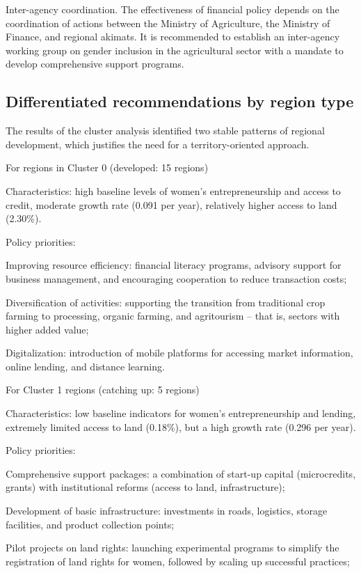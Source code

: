 ﻿\documentclass[pdflatex,sn-mathphys-ay]{sn-jnl}
\begin{document}
Inter-agency coordination. The effectiveness of financial policy depends
on the coordination of actions between the Ministry of Agriculture, the
Ministry of Finance, and regional akimats. It is recommended to
establish an inter-agency working group on gender inclusion in the
agricultural sector with a mandate to develop comprehensive support
programs.

\subsection{Differentiated recommendations by region type}

The results of the cluster analysis identified two stable patterns of
regional development, which justifies the need for a territory-oriented
approach.

For regions in Cluster 0 (developed: 15 regions)

Characteristics: high baseline levels of women's entrepreneurship and
access to credit, moderate growth rate (0.091 per year), relatively
higher access to land (2.30\%).

Policy priorities:

Improving resource efficiency: financial literacy programs, advisory
support for business management, and encouraging cooperation to reduce
transaction costs;

Diversification of activities: supporting the transition from
traditional crop farming to processing, organic farming, and agritourism
-- that is, sectors with higher added value;

Digitalization: introduction of mobile platforms for accessing market
information, online lending, and distance learning.

For Cluster 1 regions (catching up: 5 regions)

Characteristics: low baseline indicators for women's entrepreneurship
and lending, extremely limited access to land (0.18\%), but a high
growth rate (0.296 per year).

Policy priorities:

Comprehensive support packages: a combination of start-up capital
(microcredits, grants) with institutional reforms (access to land,
infrastructure);

Development of basic infrastructure: investments in roads, logistics,
storage facilities, and product collection points;

Pilot projects on land rights: launching experimental programs to
simplify the registration of land rights for women, followed by scaling
up successful practices;
\end{document}
